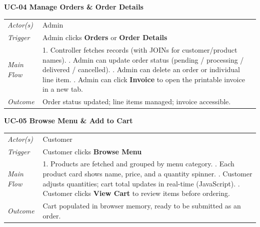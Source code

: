 \documentclass[12pt,a4paper]{article}
\begin{document}
\vspace{0.6em}

\begin{mdframed}[linecolor=primary!40, linewidth=0.6pt, roundcorner=4pt,
                 backgroundcolor=lightgray, innerleftmargin=10pt, innerrightmargin=10pt,
                 innertopmargin=8pt, innerbottommargin=8pt]
\textbf{\textcolor{primary}{UC-04} \quad Manage Orders \& Order Details}

\vspace{3pt}
\begin{tabular}{@{} L{2.6cm} p{11.6cm} @{}}
  \textit{Actor(s)}  & Admin \\
  \textit{Trigger}   & Admin clicks \textbf{Orders} or \textbf{Order Details} \\
  \textit{Main Flow} & 1. Controller fetches records (with JOINs for customer/product names). . Admin can update order status (pending / processing / delivered / cancelled). . Admin can delete an order or individual line item. . Admin can click \textbf{Invoice} to open the printable invoice in a new tab. \\
  \textit{Outcome}   & Order status updated; line items managed; invoice accessible. \\
\end{tabular}
\end{mdframed}

\vspace{0.6em}

\begin{mdframed}[linecolor=primary!40, linewidth=0.6pt, roundcorner=4pt,
                 backgroundcolor=lightgray, innerleftmargin=10pt, innerrightmargin=10pt,
                 innertopmargin=8pt, innerbottommargin=8pt]
\textbf{\textcolor{primary}{UC-05} \quad Browse Menu \& Add to Cart}

\vspace{3pt}
\begin{tabular}{@{} L{2.6cm} p{11.6cm} @{}}
  \textit{Actor(s)}  & Customer \\
  \textit{Trigger}   & Customer clicks \textbf{Browse Menu} \\
  \textit{Main Flow} & 1. Products are fetched and grouped by menu category. . Each product card shows name, price, and a quantity spinner. . Customer adjusts quantities; cart total updates in real-time (JavaScript). . Customer clicks \textbf{View Cart} to review items before ordering. \\
  \textit{Outcome}   & Cart populated in browser memory, ready to be submitted as an order. \\
\end{tabular}
\end{mdframed}
\end{document}
